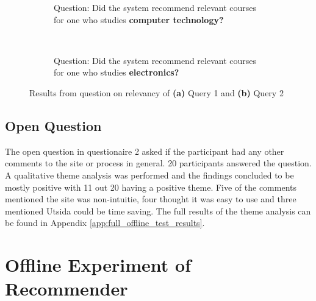 \begin{figure}[h]
    \centering
    \begin{subfigure}[b]{0.4\textwidth}
        
        \caption{Question: Did the system recommend relevant courses for one who studies \textbf{computer technology?}}
        \label{fig:gull}
    \end{subfigure}
    ~ \qquad %
    \begin{subfigure}[b]{0.4\textwidth}
       
        \caption{Question: Did the system recommend relevant courses for one who studies \textbf{electronics?}}
        \label{fig:tiger}
    \end{subfigure}
    \caption{Results from question on relevancy of \textbf{(a)} Query 1 and \textbf{(b)} Query 2}
    \label{fig:predesigned_2}
\end{figure}


\FloatBarrier

\subsection{Open Question}

The open question in questionaire 2 asked if the participant had any other comments to the site or process in general. 20 participants answered the question. A qualitative theme analysis was performed and the findings concluded to be mostly positive with 11 out 20 having a positive theme. Five of the comments mentioned the site was non-intuitie, four thought it was easy to use and three mentioned Utsida could be time saving. The full results of the theme analysis can be found in Appendix \ref{app:full_offline_test_results}.

\FloatBarrier
\section{Offline Experiment of Recommender}

